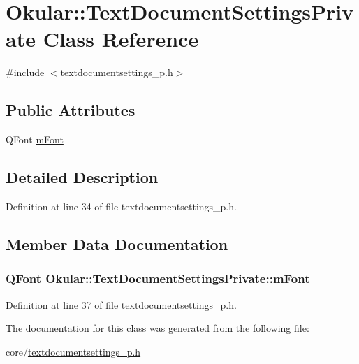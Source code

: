 \hypertarget{classOkular_1_1TextDocumentSettingsPrivate}{\section{Okular\+:\+:Text\+Document\+Settings\+Private Class Reference}
\label{classOkular_1_1TextDocumentSettingsPrivate}
}


{\ttfamily \#include $<$textdocumentsettings\+\_\+p.\+h$>$}

\subsection*{Public Attributes}
\begin{DoxyCompactItemize}
\item 
Q\+Font \hyperlink{classOkular_1_1TextDocumentSettingsPrivate_aaceb6741d732ef3c566ca5bc6bca8509}{m\+Font}
\end{DoxyCompactItemize}


\subsection{Detailed Description}


Definition at line 34 of file textdocumentsettings\+\_\+p.\+h.



\subsection{Member Data Documentation}
\hypertarget{classOkular_1_1TextDocumentSettingsPrivate_aaceb6741d732ef3c566ca5bc6bca8509}{
\subsubsection[{m\+Font}]{\setlength{\rightskip}{0pt plus 5cm}Q\+Font Okular\+::\+Text\+Document\+Settings\+Private\+::m\+Font}}\label{classOkular_1_1TextDocumentSettingsPrivate_aaceb6741d732ef3c566ca5bc6bca8509}


Definition at line 37 of file textdocumentsettings\+\_\+p.\+h.



The documentation for this class was generated from the following file\+:\begin{DoxyCompactItemize}
\item 
core/\hyperlink{textdocumentsettings__p_8h}{textdocumentsettings\+\_\+p.\+h}\end{DoxyCompactItemize}
